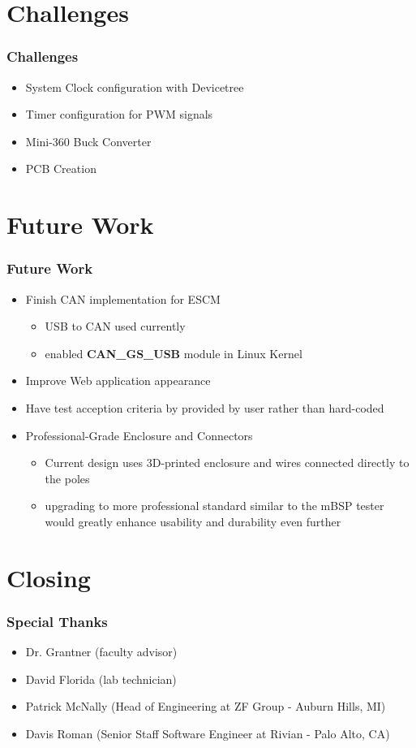 \documentclass[8pt,compress,aspectratio=169]{beamer}
\newcommand\DarkBoldP[1]{\textcolor{VSPurpleDark}{\textbf{#1}}}
\begin{document}
\section{Challenges}
\begin{frame}
  \frametitle{Challenges}
  \begin{itemize}
    \item System Clock configuration with Devicetree
    \item Timer configuration for PWM signals
    \item Mini-360 Buck Converter
    \item PCB Creation
  \end{itemize}
\end{frame}

\section{Future Work}
\begin{frame}
  \frametitle{Future Work}
  \begin{itemize}
    \item Finish CAN implementation for ESCM
      \begin{itemize}
        \item USB to CAN used currently
        \item enabled \DarkBoldP{CAN\_GS\_USB} module in Linux Kernel
      \end{itemize}
    \item Improve Web application appearance
    \item Have test acception criteria by provided by user rather than hard-coded
    \item Professional-Grade Enclosure and Connectors
      \begin{itemize}
        \item Current design uses 3D-printed enclosure and wires connected directly to the poles
        \item	upgrading to more professional standard similar to the mBSP tester would greatly enhance usability and durability even further

      \end{itemize}

  \end{itemize}

\end{frame}

\section{Closing}
\begin{frame}
  \frametitle{Special Thanks}
  \begin{itemize}
    \item Dr. Grantner (faculty advisor)
    \item David Florida (lab technician)
    \item Patrick McNally (Head of Engineering at ZF Group - Auburn Hills, MI)
    \item Davis Roman (Senior Staff Software Engineer at Rivian - Palo Alto, CA)
  \end{itemize}
\end{frame}
\end{document}
